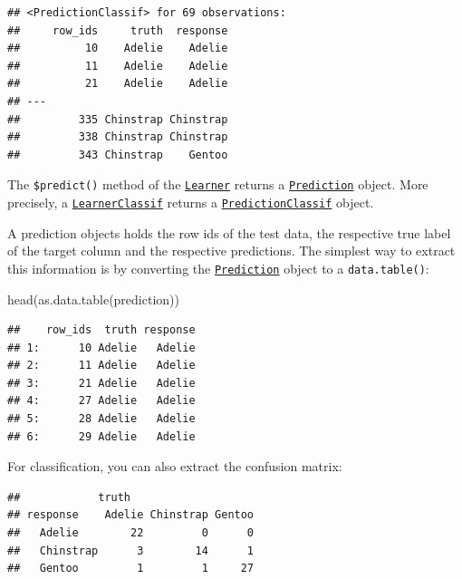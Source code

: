 \documentclass[
]{scrbook}
\newenvironment{Shaded}{\begin{snugshade}}{\end{snugshade}}
\newcommand{\FunctionTok}[1]{\textcolor[rgb]{0.00,0.00,0.00}{#1}}
\newcommand{\NormalTok}[1]{#1}
\newcommand{\SpecialCharTok}[1]{\textcolor[rgb]{0.00,0.00,0.00}{#1}}
\renewenvironment{Shaded} {\begin{snugshade}\small} {\end{snugshade}}
\begin{document}
\begin{verbatim}
## <PredictionClassif> for 69 observations:
##     row_ids     truth  response
##          10    Adelie    Adelie
##          11    Adelie    Adelie
##          21    Adelie    Adelie
## ---                            
##         335 Chinstrap Chinstrap
##         338 Chinstrap Chinstrap
##         343 Chinstrap    Gentoo
\end{verbatim}

The \texttt{\$predict()} method of the \href{https://mlr3.mlr-org.com/reference/Learner.html}{\texttt{Learner}} returns a \href{https://mlr3.mlr-org.com/reference/Prediction.html}{\texttt{Prediction}} object.
More precisely, a \href{https://mlr3.mlr-org.com/reference/LearnerClassif.html}{\texttt{LearnerClassif}} returns a \href{https://mlr3.mlr-org.com/reference/PredictionClassif.html}{\texttt{PredictionClassif}} object.

A prediction objects holds the row ids of the test data, the respective true label of the target column and the respective predictions.
The simplest way to extract this information is by converting the \href{https://mlr3.mlr-org.com/reference/Prediction.html}{\texttt{Prediction}} object to a \texttt{data.table()}:

\begin{Shaded}
\begin{Highlighting}[]
\FunctionTok{head}\NormalTok{(}\FunctionTok{as.data.table}\NormalTok{(prediction))}
\end{Highlighting}
\end{Shaded}

\begin{verbatim}
##    row_ids  truth response
## 1:      10 Adelie   Adelie
## 2:      11 Adelie   Adelie
## 3:      21 Adelie   Adelie
## 4:      27 Adelie   Adelie
## 5:      28 Adelie   Adelie
## 6:      29 Adelie   Adelie
\end{verbatim}

For classification, you can also extract the confusion matrix:

\begin{Shaded}
\end{Shaded}

\begin{verbatim}
##            truth
## response    Adelie Chinstrap Gentoo
##   Adelie        22         0      0
##   Chinstrap      3        14      1
##   Gentoo         1         1     27
\end{verbatim}
\end{document}
